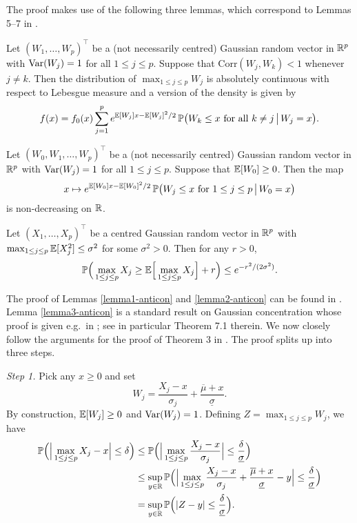 \documentclass[a4paper,12pt]{article}
\numberwithin{equation}{section}
\begin{document}
 
The proof makes use of the following three lemmas, which correspond to Lemmas 5--7 in \cite{Chernozhukov2015}. 
\begin{lemmaA}\label{lemma1-anticon}
Let $(W_1,\ldots,W_p)^\top$ be a (not necessarily centred) Gaussian random vector in $\mathbb{R}^p$ with $\textnormal{Var}(W_j) = 1$ for all $1 \le j \le p$. Suppose that $\text{Corr}(W_j,W_k) < 1$ whenever $j \ne k$. Then the distribution of $\max_{1 \le j \le p} W_j$ is absolutely continuous with respect to Lebesgue measure and a version of the density is given by 
\[ f(x) = f_0(x) \sum\limits_{j=1}^p e^{\mathbb{E}[W_j]x - \mathbb{E}[W_j]^2/2} \, \mathbb{P} \big(W_k \le x \text{ for all } k \ne j \, \big| \, W_j = x \big). \]
\end{lemmaA}
\begin{lemmaA}\label{lemma2-anticon}
Let $(W_0,W_1,\ldots,W_p)^\top$ be a (not necessarily centred) Gaussian random vector in $\mathbb{R}^p$ with $\textnormal{Var}(W_j) = 1$ for all $1 \le j \le p$. Suppose that $\mathbb{E}[W_0] \ge 0$. Then the map 
\[ x \mapsto  e^{\mathbb{E}[W_0]x - \mathbb{E}[W_0]^2/2} \, \mathbb{P} \big(W_j \le x \text{ for } 1 \le j \le p \, \big| \, W_0 = x \big) \]
is non-decreasing on $\mathbb{R}$. 
\end{lemmaA}
\begin{lemmaA}\label{lemma3-anticon}
Let $(X_1,\ldots,X_p)^\top$ be a centred Gaussian random vector in $\mathbb{R}^p$ with $\max_{1 \le j \le p} \mathbb{E}[X_j^2] \le \sigma^2$ for some $\sigma^2 > 0$. Then for any $r > 0$, 
\[ \mathbb{P} \Big( \max_{1 \le j \le p} X_j \ge \mathbb{E} \Big[ \max_{1 \le j \le p} X_j \Big] + r \Big) \le e^{-r^2/(2\sigma^2)}. \]
\end{lemmaA} 
The proof of Lemmas \ref{lemma1-anticon} and \ref{lemma2-anticon} can be found in \cite{Chernozhukov2015}. Lemma \ref{lemma3-anticon} is a standard result on Gaussian concentration whose proof is given e.g.\ in \cite{Ledoux2001}; see in particular Theorem 7.1 therein. We now closely follow the arguments for the proof of Theorem 3 in \cite{Chernozhukov2015}. The proof splits up into three steps. 
\vspace{10pt}


\textit{Step 1.} Pick any $x \ge 0$ and set 
\[ W_j = \frac{X_j - x}{\sigma_j} + \frac{\overline{\mu} + x}{\underline{\sigma}}. \]
By construction, $\mathbb{E}[W_j] \ge 0$ and $\textnormal{Var}(W_j) = 1$. Defining $Z = \max_{1 \le j \le p} W_j$, we have  
\begin{align*}
\mathbb{P} \Big( \Big| \max_{1 \le j \le p} X_j - x \Big| \le \delta \Big) 
 & \le \mathbb{P} \Big( \Big| \max_{1 \le j \le p} \frac{X_j - x}{\sigma_j} \Big| \le \frac{\delta}{\underline{\sigma}} \Big) \\
 & \le \sup_{y \in \mathbb{R}} \mathbb{P} \Big( \Big| \max_{1 \le j \le p} \frac{X_j - x}{\sigma_j} + \frac{\overline{\mu} + x}{\underline{\sigma}} - y \Big| \le \frac{\delta}{\underline{\sigma}} \Big) \\
 & = \sup_{y \in \mathbb{R}} \mathbb{P} \Big( |Z - y| \le \frac{\delta}{\underline{\sigma}} \Big). 
\end{align*}
\vspace{1pt}
\end{document}
